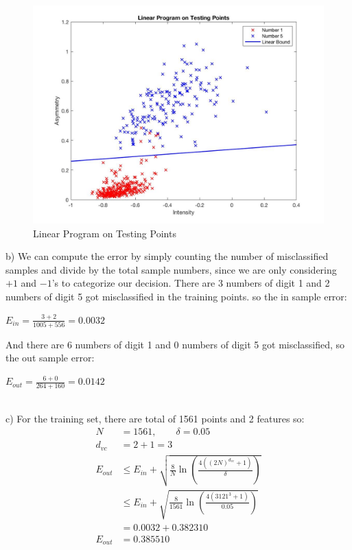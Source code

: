 \documentclass[12pt]{article}
\begin{document}
\begin{figure}[H]
  \centering
  \includegraphics[scale = 0.3]{Pic2.jpg}
  \caption{Linear Program on Testing Points}
  \label{fig:Pic2}
\end{figure}
b) We can compute the error by simply counting the number of misclassified samples and divide by the total sample numbers, since we are only considering $+1$ and $-1$'s to categorize our decision. There are 3 numbers of digit 1 and 2 numbers of digit 5 got misclassified in the training points. so the in sample error:
\begin{center}
$\displaystyle E_{in} = \frac{3+2}{1005+556} = 0.0032$
\end{center}
And there are 6 numbers of digit 1 and 0 numbers of digit 5 got misclassified, so the out sample error:
\begin{center}
$\displaystyle E_{out} = \frac{6+0}{264+160} = 0.0142$
\end{center} \indent\\
\indent c) For the training set, there are total of 1561 points and 2 features so:
\begin{align*}\displaystyle
	N &= 1561, \qquad \delta = 0.05 \\
	d_{vc} &= 2+1 = 3 \\
	E_{out} & \leq E_{in} + \sqrt{ \frac{8}{N}\ln\left(\frac{4( (2N)^{d_{vc}}+1 )}{\delta}\right) } \\
	& \leq E_{in} + \sqrt{ \frac{8}{1561}\ln\left(\frac{4( 3121^3+1 )}{0.05}\right) } \\
	& = 0.0032 + 0.382310 \\
        E_{out} &  = 0.385510
\end{align*}
\end{document}
